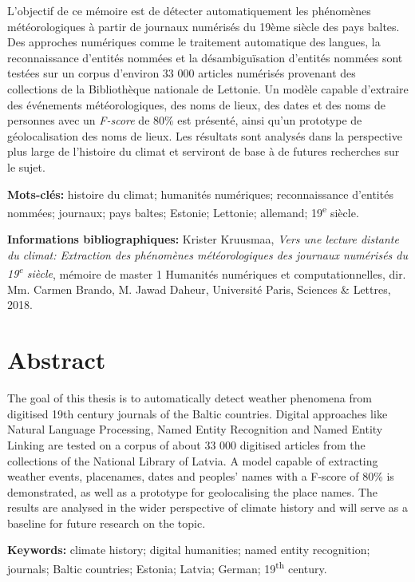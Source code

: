 \documentclass[a4paper,twoside,12pt]{article}
\begin{document}
L'objectif de ce mémoire est de détecter automatiquement les phénomènes météorologiques à partir de journaux numérisés du 19ème siècle des pays baltes. Des approches numériques comme le traitement automatique des langues, la reconnaissance d'entités nommées et la désambiguïsation d'entités nommées sont testées sur un corpus d'environ 33 000 articles numérisés provenant des collections de la Bibliothèque nationale de Lettonie. Un modèle capable d'extraire des événements météorologiques, des noms de lieux, des dates et des noms de personnes avec un \textit{F-score} de 80\% est présenté, ainsi qu'un prototype de géolocalisation des noms de lieux. Les résultats sont analysés dans la perspective plus large de l'histoire du climat et serviront de base à de futures recherches sur le sujet.

\medskip

\textbf{Mots-clés:} histoire du climat; humanités numériques; reconnaissance d'entités nommées; journaux; pays baltes; Estonie; Lettonie; allemand; 19\textsuperscript{e} siècle.

\textbf{Informations bibliographiques:} Krister Kruusmaa, \textit{Vers une lecture distante du climat: Extraction des phénomènes météorologiques des journaux numérisés du 19\textsuperscript{e} siècle}, mémoire de master 1 \og Humanités numériques et computationnelles\fg{}, dir. Mm. Carmen Brando, M. Jawad Daheur, Université Paris, Sciences \& Lettres, 2018.


\section*{Abstract}

The goal of this thesis is to automatically detect weather phenomena from digitised 19th century journals of the Baltic countries. Digital approaches like Natural Language Processing, Named Entity Recognition and Named Entity Linking are tested on a corpus of about 33 000 digitised articles from the collections of the National Library of Latvia. A model capable of extracting weather events, placenames, dates and peoples' names with a F-score of 80\% is demonstrated, as well as a prototype for geolocalising the place names. The results are analysed in the wider perspective of climate history and will serve as a baseline for future research on the topic.

\medskip

\textbf{Keywords:} climate history; digital humanities; named entity recognition; journals; Baltic countries; Estonia; Latvia; German; 19\textsuperscript{th} century.
\end{document}
